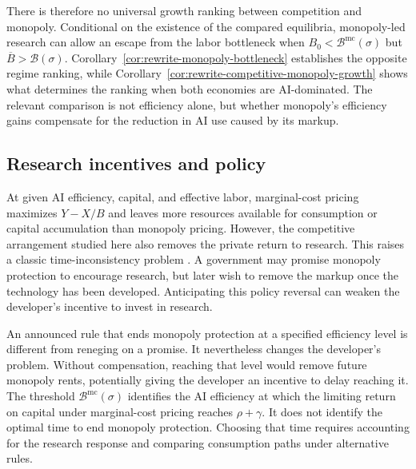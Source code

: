 
There is therefore no universal growth ranking between competition and
monopoly. Conditional on the existence of the compared equilibria,
monopoly-led research can allow an escape from the labor bottleneck when
$B_0<\mathcal B^{\mathrm{mc}}(\sigma)$ but
$\overline B>\mathcal B(\sigma)$.
Corollary~\ref{cor:rewrite-monopoly-bottleneck} establishes the opposite
regime ranking, while Corollary~\ref{cor:rewrite-competitive-monopoly-growth}
shows what determines the ranking when both economies are AI-dominated.
The relevant comparison is not efficiency alone, but whether monopoly's
efficiency gains compensate for the reduction in AI use caused by its markup.

\subsection{Research incentives and policy}
\label{subsec:rewrite-competition-policy}

At given AI efficiency, capital, and effective labor, marginal-cost pricing maximizes $Y-X/B$ and leaves more resources available for consumption or capital accumulation than monopoly pricing. However, the competitive arrangement studied here also removes the private return to research. This raises a classic time-inconsistency problem \citep{kydlandprescott1977}. A government may promise monopoly protection to encourage research, but later wish to remove the markup once the technology has been developed.
Anticipating this policy reversal can weaken the developer's incentive to invest in research. 

An announced rule that ends monopoly protection at a specified efficiency level is different from reneging on a promise. It nevertheless changes the developer's problem. Without compensation, reaching that level would remove future monopoly rents, potentially giving the developer an incentive to delay reaching it. The threshold $\mathcal B^{\mathrm{mc}}(\sigma)$ identifies the AI efficiency at which the
limiting return on capital under marginal-cost pricing reaches $\rho+\gamma$. It does not identify the optimal time to end monopoly protection.
Choosing that time requires accounting for the
research response and comparing consumption paths under alternative rules.

